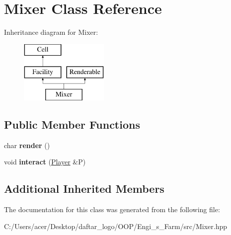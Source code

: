 \hypertarget{class_mixer}{}\section{Mixer Class Reference}
\label{class_mixer}
Inheritance diagram for Mixer\+:\begin{figure}[H]
\begin{center}
\leavevmode
\includegraphics[height=3.000000cm]{class_mixer}
\end{center}
\end{figure}
\subsection*{Public Member Functions}
\begin{DoxyCompactItemize}
\item 
\mbox{\label{class_mixer_a1cad77a40034f7c0f6cf47e8185ba0a3}} 
char {\bfseries render} ()
\item 
\mbox{\label{class_mixer_aec7813341b8f42c7e81732661ea34b23}} 
void {\bfseries interact} (\mbox{\hyperlink{class_player}{Player}} \&P)
\end{DoxyCompactItemize}
\subsection*{Additional Inherited Members}


The documentation for this class was generated from the following file\+:\begin{DoxyCompactItemize}
\item 
C\+:/\+Users/acer/\+Desktop/daftar\+\_\+logo/\+O\+O\+P/\+Engi\+\_\+s\+\_\+\+Farm/src/Mixer.\+hpp\end{DoxyCompactItemize}
